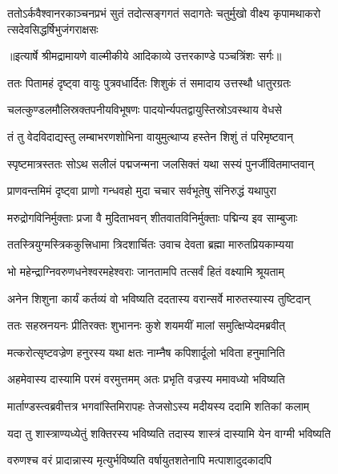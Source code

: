 \fourlineindentedshloka
{ततोऽर्कवैश्वानरकाञ्चनप्रभं}
{ सुतं तदोत्सङ्गगतं सदागतेः}
{चतुर्मुखो वीक्ष्य कृपामथाकरो}
{त्सदेवसिद्धर्षिभुजंगराक्षसः} %


{॥इत्यार्षे श्रीमद्रामायणे वाल्मीकीये आदिकाव्ये उत्तरकाण्डे पञ्चत्रिंशः सर्गः॥}


\twolineshloka
{ततः पितामहं दृष्ट्वा वायुः पुत्रवधार्दितः}
{शिशुकं तं समादाय उत्तस्थौ धातुरग्रतः} %

\twolineshloka
{चलत्कुण्डलमौलिस्रक्तपनीयविभूषणः}
{पादयोर्न्यपतद्वायुस्तिस्रोऽवस्थाय वेधसे} %

\twolineshloka
{तं तु वेदविदाद्यस्तु लम्बाभरणशोभिना}
{वायुमुत्थाप्य हस्तेन शिशुं तं परिमृष्टवान्} %

\twolineshloka
{स्पृष्टमात्रस्ततः सोऽथ सलीलं पद्मजन्मना}
{जलसिक्तं यथा सस्यं पुनर्जीवितमाप्तवान्} %

\twolineshloka
{प्राणवन्तमिमं दृष्ट्वा प्राणो गन्धवहो मुदा}
{चचार सर्वभूतेषु संनिरुद्धं यथापुरा} %

\twolineshloka
{मरुद्रोगविनिर्मुक्ताः प्रजा वै मुदिताभवन्}
{शीतवातविनिर्मुक्ताः पद्मिन्य इव साम्बुजाः} %

\twolineshloka
{ततस्त्रियुग्मस्त्रिककुत्त्रिधामा त्रिदशार्चितः}
{उवाच देवता ब्रह्मा मारुतप्रियकाम्यया} %

\twolineshloka
{भो महेन्द्राग्निवरुणधनेश्वरमहेश्वराः}
{जानतामपि तत्सर्वं हितं वक्ष्यामि श्रूयताम्} %

\twolineshloka
{अनेन शिशुना कार्यं कर्तव्यं वो भविष्यति}
{ददतास्य वरान्सर्वे मारुतस्यास्य तुष्टिदान्} %

\twolineshloka
{ततः सहस्रनयनः प्रीतिरक्तः शुभाननः}
{कुशे शयमयीं मालां समुत्क्षिप्येदमब्रवीत्} %

\twolineshloka
{मत्करोत्सृष्टवज्रेण हनुरस्य यथा क्षतः}
{नाम्नैष कपिशार्दूलो भविता हनुमानिति} %

\twolineshloka
{अहमेवास्य दास्यामि परमं वरमुत्तमम्}
{अतः प्रभृति वज्रस्य ममावध्यो भविष्यति} %

\twolineshloka
{मार्ताण्डस्त्वब्रवीत्तत्र भगवांस्तिमिरापहः}
{तेजसोऽस्य मदीयस्य ददामि शतिकां कलाम्} %

\twolineshloka
{यदा तु शास्त्राण्यध्येतुं शक्तिरस्य भविष्यति}
{तदास्य शास्त्रं दास्यामि येन वाग्मी भविष्यति} %

\twolineshloka
{वरुणश्च वरं प्रादान्नास्य मृत्युर्भविष्यति}
{वर्षायुतशतेनापि मत्पाशादुदकादपि} %

